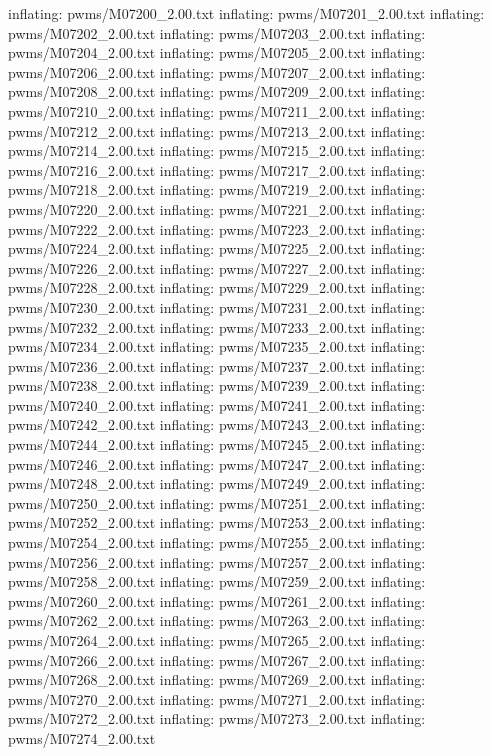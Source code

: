 \documentclass[letterpaper,10pt,english]{sphinxmanual}
\begin{document}
{\begin{sphinxVerbatim}[commandchars=\\\{\}]
  inflating: pwms/M07200\_2.00.txt
  inflating: pwms/M07201\_2.00.txt
  inflating: pwms/M07202\_2.00.txt
  inflating: pwms/M07203\_2.00.txt
  inflating: pwms/M07204\_2.00.txt
  inflating: pwms/M07205\_2.00.txt
  inflating: pwms/M07206\_2.00.txt
  inflating: pwms/M07207\_2.00.txt
  inflating: pwms/M07208\_2.00.txt
  inflating: pwms/M07209\_2.00.txt
  inflating: pwms/M07210\_2.00.txt
  inflating: pwms/M07211\_2.00.txt
  inflating: pwms/M07212\_2.00.txt
  inflating: pwms/M07213\_2.00.txt
  inflating: pwms/M07214\_2.00.txt
  inflating: pwms/M07215\_2.00.txt
  inflating: pwms/M07216\_2.00.txt
  inflating: pwms/M07217\_2.00.txt
  inflating: pwms/M07218\_2.00.txt
  inflating: pwms/M07219\_2.00.txt
  inflating: pwms/M07220\_2.00.txt
  inflating: pwms/M07221\_2.00.txt
  inflating: pwms/M07222\_2.00.txt
  inflating: pwms/M07223\_2.00.txt
  inflating: pwms/M07224\_2.00.txt
  inflating: pwms/M07225\_2.00.txt
  inflating: pwms/M07226\_2.00.txt
  inflating: pwms/M07227\_2.00.txt
  inflating: pwms/M07228\_2.00.txt
  inflating: pwms/M07229\_2.00.txt
  inflating: pwms/M07230\_2.00.txt
  inflating: pwms/M07231\_2.00.txt
  inflating: pwms/M07232\_2.00.txt
  inflating: pwms/M07233\_2.00.txt
  inflating: pwms/M07234\_2.00.txt
  inflating: pwms/M07235\_2.00.txt
  inflating: pwms/M07236\_2.00.txt
  inflating: pwms/M07237\_2.00.txt
  inflating: pwms/M07238\_2.00.txt
  inflating: pwms/M07239\_2.00.txt
  inflating: pwms/M07240\_2.00.txt
  inflating: pwms/M07241\_2.00.txt
  inflating: pwms/M07242\_2.00.txt
  inflating: pwms/M07243\_2.00.txt
  inflating: pwms/M07244\_2.00.txt
  inflating: pwms/M07245\_2.00.txt
  inflating: pwms/M07246\_2.00.txt
  inflating: pwms/M07247\_2.00.txt
  inflating: pwms/M07248\_2.00.txt
  inflating: pwms/M07249\_2.00.txt
  inflating: pwms/M07250\_2.00.txt
  inflating: pwms/M07251\_2.00.txt
  inflating: pwms/M07252\_2.00.txt
  inflating: pwms/M07253\_2.00.txt
  inflating: pwms/M07254\_2.00.txt
  inflating: pwms/M07255\_2.00.txt
  inflating: pwms/M07256\_2.00.txt
  inflating: pwms/M07257\_2.00.txt
  inflating: pwms/M07258\_2.00.txt
  inflating: pwms/M07259\_2.00.txt
  inflating: pwms/M07260\_2.00.txt
  inflating: pwms/M07261\_2.00.txt
  inflating: pwms/M07262\_2.00.txt
  inflating: pwms/M07263\_2.00.txt
  inflating: pwms/M07264\_2.00.txt
  inflating: pwms/M07265\_2.00.txt
  inflating: pwms/M07266\_2.00.txt
  inflating: pwms/M07267\_2.00.txt
  inflating: pwms/M07268\_2.00.txt
  inflating: pwms/M07269\_2.00.txt
  inflating: pwms/M07270\_2.00.txt
  inflating: pwms/M07271\_2.00.txt
  inflating: pwms/M07272\_2.00.txt
  inflating: pwms/M07273\_2.00.txt
  inflating: pwms/M07274\_2.00.txt

\end{sphinxVerbatim}}
\end{document}
